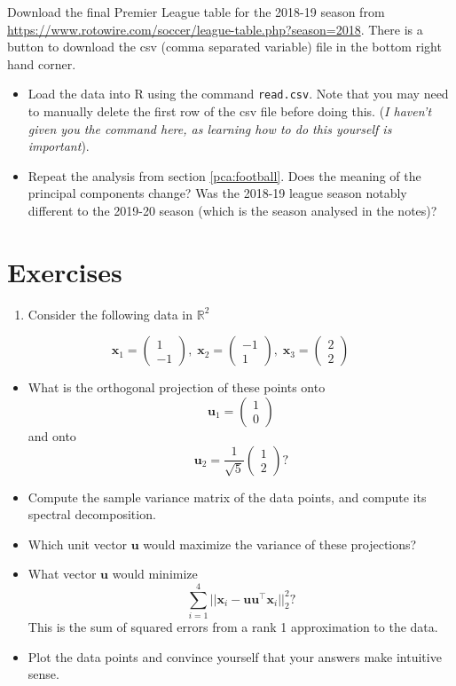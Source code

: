 \documentclass[]{book}
\providecommand{\tightlist}{%
  \setlength{\itemsep}{0pt}\setlength{\parskip}{0pt}}
\theoremstyle{definition}
\theoremstyle{definition}
\theoremstyle{definition}
\theoremstyle{remark}
\begin{document}
Download the final Premier League table for the 2018-19 season from
\url{https://www.rotowire.com/soccer/league-table.php?season=2018}. There is a button to download the csv (comma separated variable) file in the bottom right hand corner.

\begin{itemize}
\item
  Load the data into R using the command \texttt{read.csv}. Note that you may need to manually delete the first row of the csv file before doing this. (\emph{I haven't given you the command here, as learning how to do this yourself is important}).
\item
  Repeat the analysis from section \ref{pca:football}. Does the meaning of the principal components change? Was the 2018-19 league season notably different to the 2019-20 season (which is the season analysed in the notes)?
\end{itemize}

\hypertarget{exercises-1}{%
\section{Exercises}\label{exercises-1}}

\begin{enumerate}
\def\labelenumi{\arabic{enumi}.}
\tightlist
\item
  Consider the following data in \(\mathbb{R}^2\)
\end{enumerate}

\[\mathbf x_1 =\begin{pmatrix}1\\-1\end{pmatrix},\; \mathbf x_2 =\begin{pmatrix}-1\\1\end{pmatrix},
\;\mathbf x_3 =\begin{pmatrix}2\\2\end{pmatrix}\]

\begin{itemize}
\item
  What is the orthogonal projection of these points onto \[\mathbf u_1 = \begin{pmatrix}1\\0\end{pmatrix}\] and onto \[\mathbf u_2 =\frac{1}{\sqrt{5}}\begin{pmatrix}1\\2\end{pmatrix}?\]
\item
  Compute the sample variance matrix of the data points, and compute its spectral decomposition.
\item
  Which unit vector \(\mathbf u\) would maximize the variance of these projections?
\item
  What vector \(\mathbf u\) would minimize
  \[\sum_{i=1}^4 ||\mathbf x_i -\mathbf u\mathbf u^\top \mathbf x_i||^2_2?\]
  This is the sum of squared errors from a rank 1 approximation to the data.
\item
  Plot the data points and convince yourself that your answers make intuitive sense.
\end{itemize}
\end{document}
